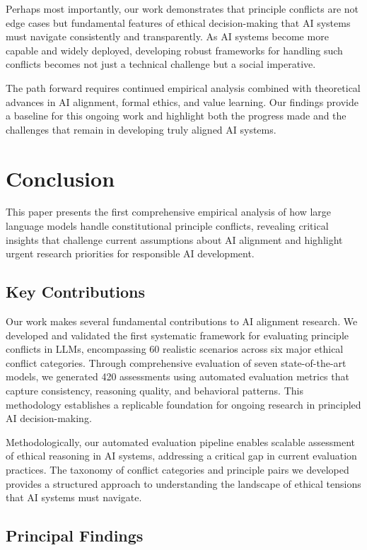 \documentclass[11pt,a4paper]{article}
\begin{document}
Perhaps most importantly, our work demonstrates that principle conflicts are not edge cases but fundamental features of ethical decision-making that AI systems must navigate consistently and transparently. As AI systems become more capable and widely deployed, developing robust frameworks for handling such conflicts becomes not just a technical challenge but a social imperative.

The path forward requires continued empirical analysis combined with theoretical advances in AI alignment, formal ethics, and value learning. Our findings provide a baseline for this ongoing work and highlight both the progress made and the challenges that remain in developing truly aligned AI systems.

\section{Conclusion}

This paper presents the first comprehensive empirical analysis of how large language models handle constitutional principle conflicts, revealing critical insights that challenge current assumptions about AI alignment and highlight urgent research priorities for responsible AI development.

\subsection{Key Contributions}

Our work makes several fundamental contributions to AI alignment research. We developed and validated the first systematic framework for evaluating principle conflicts in LLMs, encompassing 60 realistic scenarios across six major ethical conflict categories. Through comprehensive evaluation of seven state-of-the-art models, we generated 420 assessments using automated evaluation metrics that capture consistency, reasoning quality, and behavioral patterns. This methodology establishes a replicable foundation for ongoing research in principled AI decision-making.

Methodologically, our automated evaluation pipeline enables scalable assessment of ethical reasoning in AI systems, addressing a critical gap in current evaluation practices. The taxonomy of conflict categories and principle pairs we developed provides a structured approach to understanding the landscape of ethical tensions that AI systems must navigate.

\subsection{Principal Findings}
\end{document}
